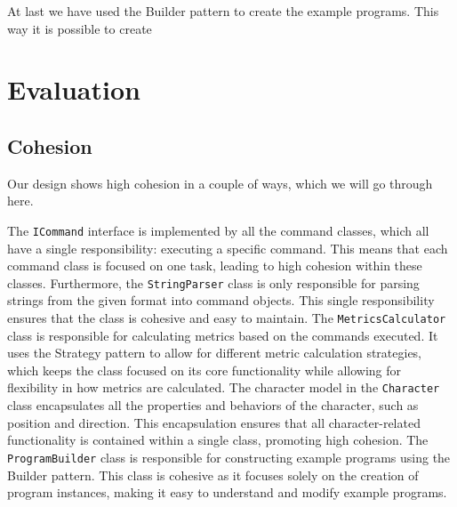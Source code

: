 \documentclass[11pt,a4paper]{article}
\begin{document}
At last we have used the Builder pattern to create the example programs.
This way it is possible to create 



\section*{Evaluation}

\subsection*{Cohesion}

Our design shows high cohesion in a couple of ways, which we will go through here. 

The \texttt{ICommand} interface is implemented by all the command classes, which all have a single responsibility: executing a specific command. This means that each command class is focused on one task, leading to high cohesion within these classes.
Furthermore, the \texttt{StringParser} class is only responsible for parsing strings from the given format into command objects. This single responsibility ensures that the class is cohesive and easy to maintain.
The \texttt{MetricsCalculator} class is responsible for calculating metrics based on the commands executed. It uses the Strategy pattern to allow for different metric calculation strategies, which keeps the class focused on its core functionality while allowing for flexibility in how metrics are calculated.
The character model in the \texttt{Character} class encapsulates all the properties and behaviors of the character, such as position and direction. This encapsulation ensures that all character-related functionality is contained within a single class, promoting high cohesion.
The \texttt{ProgramBuilder} class is responsible for constructing example programs using the Builder pattern. This class is cohesive as it focuses solely on the creation of program instances, making it easy to understand and modify example programs. 
\end{document}
